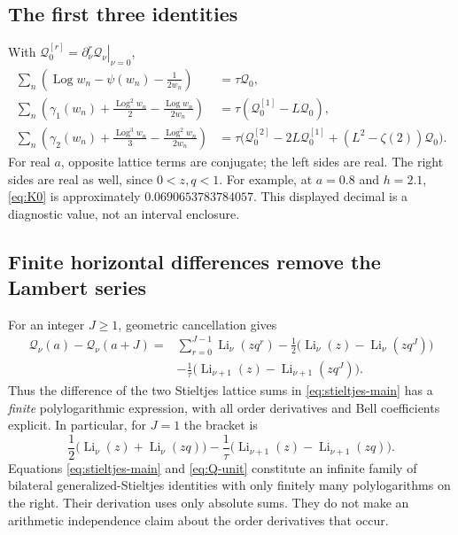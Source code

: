 \documentclass[11pt,a4paper]{article}
\numberwithin{equation}{section}
\theoremstyle{definition}
\theoremstyle{remark}
\DeclareMathOperator{\Li}{Li}
\DeclareMathOperator{\Log}{Log}
\newcommand{\Qcal}{\mathcal Q}
\begin{document}
\subsection{The first three identities}
With $\Qcal_0^{[r]}=\left.\partial_\nu^r\Qcal_\nu\right|_{\nu=0}$,
\begin{align}
 \sum_n\left(\Log w_n-\psi(w_n)-\frac1{2w_n}\right)
   &=\tau\Qcal_0,\label{eq:K0}\\
 \sum_n\left(\gamma_1(w_n)+\frac{\Log^2w_n}{2}
                         -\frac{\Log w_n}{2w_n}\right)
   &=\tau(\Qcal_0^{[1]}-L\Qcal_0),\label{eq:K1}\\
 \sum_n\left(\gamma_2(w_n)+\frac{\Log^3w_n}{3}
                         -\frac{\Log^2w_n}{2w_n}\right)
   &=\tau\bigl(\Qcal_0^{[2]}-2L\Qcal_0^{[1]}
                     +(L^2-\zeta(2))\Qcal_0\bigr).
 \label{eq:K2}
\end{align}
For real $a$, opposite lattice terms are conjugate; the left sides
are real. The right sides are real as well, since $0<z,q<1$.
For example, at $a=0.8$ and $h=2.1$, \eqref{eq:K0} is approximately
$0.0690653783784057$. This displayed decimal is a diagnostic value,
not an interval enclosure.

\subsection{Finite horizontal differences remove the Lambert series}
For an integer $J\ge1$, geometric cancellation gives
\begin{equation}\label{eq:Q-finite}
 \begin{split}
 \Qcal_\nu(a)-\Qcal_\nu(a+J)
 ={}&\sum_{r=0}^{J-1}\Li_\nu(zq^r)
       -\frac12\bigl(\Li_\nu(z)-\Li_\nu(zq^J)\bigr)\\
    &-\frac1\tau\bigl(\Li_{\nu+1}(z)-\Li_{\nu+1}(zq^J)\bigr).
 \end{split}
\end{equation}
Thus the difference of the two Stieltjes lattice sums in
\eqref{eq:stieltjes-main} has a \emph{finite} polylogarithmic
expression, with all order derivatives and Bell coefficients explicit.
In particular, for $J=1$ the bracket is
\begin{equation}\label{eq:Q-unit}
 \frac12\bigl(\Li_\nu(z)+\Li_\nu(zq)\bigr)
 -\frac1\tau\bigl(\Li_{\nu+1}(z)-\Li_{\nu+1}(zq)\bigr).
\end{equation}
Equations \eqref{eq:stieltjes-main} and \eqref{eq:Q-unit} constitute
an infinite family of bilateral generalized-Stieltjes identities with
only finitely many polylogarithms on the right. Their derivation uses
only absolute sums. They do not make an arithmetic independence claim
about the order derivatives that occur.
\end{document}
